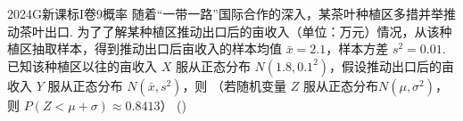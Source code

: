 
\begin{problem}{2024}{G}{新课标I卷}{9}{概率}
随着“一带一路”国际合作的深入，某茶叶种植区多措并举推动茶叶出口. 为了了解某种植区推动出口后的亩收入（单位：万元）情况，从该种植区抽取样本，得到推动出口后亩收入的样本均值 $\bar{x}=2.1$，样本方差 $s^2=0.01$. 已知该种植区以往的亩收入 $X$ 服从正态分布 $N(1.8, 0.1^2)$，假设推动出口后的亩收入 $Y$ 服从正态分布 $N(\bar{x}, s^2)$，则
（若随机变量 $Z$ 服从正态分布$N(\mu, \sigma^2)$，则 $P(Z<\mu+\sigma)\approx 0.8413$）
(\hspace{1cm})
\begin{choices}
\end{choices}
\end{problem}